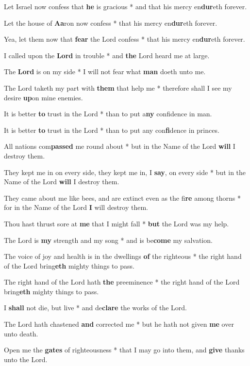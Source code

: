 \begin{multicols}{2}
	Let Israel now confess that \textbf{he} is gracious * and that his mercy en\textbf{dur}eth forever.
	
	Let the house of \textbf{Aa}ron now confess * that his mercy en\textbf{dur}eth forever.
	
	Yea, let them now that \textbf{fear} the Lord confess * that his mercy en\textbf{dur}eth forever.
	
	I called upon the \textbf{Lord} in trouble * and \textbf{the} Lord heard me at large.
	
	The \textbf{Lord} is on my side * I will not fear what \textbf{man} doeth unto me.
	
	The Lord taketh my part with \textbf{them} that help me * therefore shall I see my desire \textbf{up}on mine enemies.
	
	It is better \textbf{to} trust in the Lord * than to put a\textbf{ny} confidence in man.
	
	It is better \textbf{to} trust in the Lord * than to put any con\textbf{fi}dence in princes.
	
	All nations com\textbf{passed} me round about * but in the Name of the Lord \textbf{will} I destroy them.
	
	They kept me in on every side, they kept me in, I \textbf{say}, on every side * but in the Name of the Lord \textbf{will} I destroy them.
	
	They came about me like bees, and are extinct even as the fi\textbf{re} among thorns * for in the Name of the Lord \textbf{I} will destroy them.
	
	Thou hast thrust sore at \textbf{me} that I might fall * \textbf{but} the Lord was my help.
	
	The Lord is \textbf{my} strength and my song * and is be\textbf{come} my salvation.
	
	The voice of joy and health is in the dwellings \textbf{of} the righteous * the right hand of the Lord bring\textbf{eth} mighty things to pass.
	
	The right hand of the Lord hath \textbf{the} preeminence * the right hand of the Lord bring\textbf{eth} mighty things to pass.
	
	I \textbf{shall} not die, but live * and de\textbf{clare} the works of the Lord.
	
	The Lord hath chastened \textbf{and} corrected me * but he hath not given \textbf{me} over unto death.
	
	Open me the \textbf{gates} of righteousness * that I may go into them, and \textbf{give} thanks unto the Lord.
	

\end{multicols}
